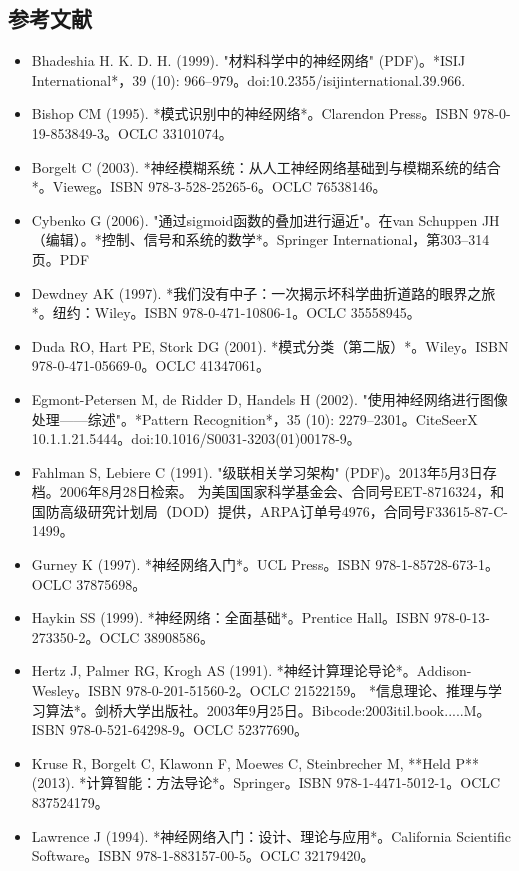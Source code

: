 \subsection{参考文献}
\begin{itemize}
\item Bhadeshia H. K. D. H. (1999). "材料科学中的神经网络" (PDF)。*ISIJ International*，39 (10): 966–979。doi:10.2355/isijinternational.39.966.  
\item Bishop CM (1995). *模式识别中的神经网络*。Clarendon Press。ISBN 978-0-19-853849-3。OCLC 33101074。  
\item Borgelt C (2003). *神经模糊系统：从人工神经网络基础到与模糊系统的结合*。Vieweg。ISBN 978-3-528-25265-6。OCLC 76538146。  
\item Cybenko G (2006). "通过sigmoid函数的叠加进行逼近"。在van Schuppen JH（编辑）。*控制、信号和系统的数学*。Springer International，第303–314页。PDF  
\item Dewdney AK (1997). *我们没有中子：一次揭示坏科学曲折道路的眼界之旅*。纽约：Wiley。ISBN 978-0-471-10806-1。OCLC 35558945。  
\item Duda RO, Hart PE, Stork DG (2001). *模式分类（第二版）*。Wiley。ISBN 978-0-471-05669-0。OCLC 41347061。  
\item Egmont-Petersen M, de Ridder D, Handels H (2002). "使用神经网络进行图像处理——综述"。*Pattern Recognition*，35 (10): 2279–2301。CiteSeerX 10.1.1.21.5444。doi:10.1016/S0031-3203(01)00178-9。  
\item Fahlman S, Lebiere C (1991). "级联相关学习架构" (PDF)。2013年5月3日存档。2006年8月28日检索。  
为美国国家科学基金会、合同号EET-8716324，和国防高级研究计划局（DOD）提供，ARPA订单号4976，合同号F33615-87-C-1499。  
\item Gurney K (1997). *神经网络入门*。UCL Press。ISBN 978-1-85728-673-1。OCLC 37875698。  
\item Haykin SS (1999). *神经网络：全面基础*。Prentice Hall。ISBN 978-0-13-273350-2。OCLC 38908586。  
\item Hertz J, Palmer RG, Krogh AS (1991). *神经计算理论导论*。Addison-Wesley。ISBN 978-0-201-51560-2。OCLC 21522159。  
*信息理论、推理与学习算法*。剑桥大学出版社。2003年9月25日。Bibcode:2003itil.book.....M。ISBN 978-0-521-64298-9。OCLC 52377690。  
\item Kruse R, Borgelt C, Klawonn F, Moewes C, Steinbrecher M, **Held P** (2013). *计算智能：方法导论*。Springer。ISBN 978-1-4471-5012-1。OCLC 837524179。  
\item Lawrence J (1994). *神经网络入门：设计、理论与应用*。California Scientific Software。ISBN 978-1-883157-00-5。OCLC 32179420。  

\end{itemize}
